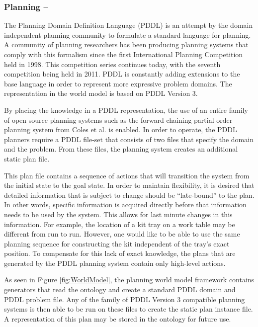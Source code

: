 \documentclass{llncs}
\begin{document}
\subsubsection{Planning --}
The Planning Domain Definition Language (PDDL)  is an attempt by the domain independent planning community to formulate a standard language for planning. A community of planning researchers has been producing planning systems that comply with this formalism since the first International Planning Competition held in 1998. This competition series
continues today, with the seventh competition being held in 2011. PDDL is constantly adding extensions to the base language in order to represent more expressive problem domains. The representation in the world model is based on PDDL Version 3.

By placing the knowledge in a PDDL representation, the use of an entire family of open source planning systems such as the forward-chaining partial-order planning system from Coles et al. \cite{Coles.ICAPS.2010}
is enabled. In order to operate, the PDDL planners require a PDDL file-set that consists of two files that specify the domain and the problem.
From these files, the planning system creates an additional static plan file.

This plan file contains a sequence of actions that will transition the system from the initial state to the goal state. In order to maintain flexibility, it is desired that detailed information that is subject to change should be ``late-bound'' to the plan. In other words, specific information is acquired directly before that information needs to be used by the system. This allows for last minute changes in this information. For example, the location of a kit tray on a work table may be different from run to run. However, one would like to be able to use the same planning sequence for constructing the kit independent of the tray's exact position.
To compensate for this lack of exact knowledge, the plans that are generated by the PDDL planning system contain only high-level actions.

As seen in Figure \ref{fig:WorldModel}, the planning world model framework contains generators that read the ontology and create
a standard PDDL domain and PDDL problem file. Any of the family of PDDL Version 3 compatible planning systems is then able to be
run on these files to create the static plan instance file. A representation of this plan may be stored in the ontology for future use.
\end{document}
